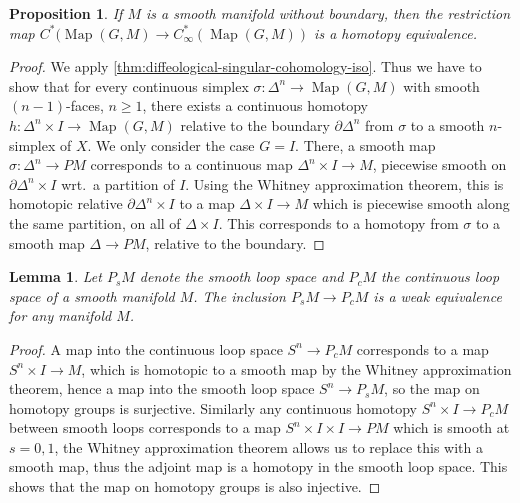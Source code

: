 \documentclass{scrartcl}
\theoremstyle{plain}
\newtheorem{proposition}[theorem]{Proposition}
\newtheorem{lemma}[theorem]{Lemma}
\theoremstyle{definition}
\DeclareMathOperator{\Map}{Map}
\begin{document}
\begin{proposition}\label{prop:comparison-singular-smooth-cohomology}
    If $M$ is a smooth manifold without boundary, then the restriction map $C^*(\Map(G, M) \to C_\infty^*(\Map(G, M))$ is a homotopy equivalence.
\end{proposition}
\begin{proof}
    We apply \cref{thm:diffeological-singular-cohomology-iso}. Thus we have to show that for every continuous simplex $\sigma\colon \Delta^n\to \Map(G, M)$ with smooth $(n-1)$-faces, $n\geq 1$, there exists a continuous homotopy $h\colon \Delta^n\times I\to \Map(G, M)$ relative to the boundary $\partial\Delta^n$ from $\sigma$ to a smooth $n$-simplex of $X$. We only consider the case $G=I$. There, a smooth map $\sigma\colon\Delta^n\to PM$ corresponds to a continuous map $\Delta^n\times I\to M$, piecewise smooth on $\partial\Delta^n\times I$ wrt.\ a partition of $I$. Using the Whitney approximation theorem, this is homotopic relative $\partial\Delta^n\times I$ to a map $\Delta\times I\to M$ which is piecewise smooth along the same partition, on all of $\Delta\times I$. This corresponds to a homotopy from $\sigma$ to a smooth map $\Delta\to PM$, relative to the boundary. 
\end{proof}

\begin{lemma}
Let $P_sM$ denote the smooth loop space and $P_cM$ the continuous loop space of a smooth manifold $M$. The inclusion $P_sM\to P_cM$ is a weak equivalence for any manifold $M$. 
\end{lemma}
\begin{proof}
    A map into the continuous loop space $S^n\to P_cM$ corresponds to a map $S^n\times I\to M$, which is homotopic to a smooth map by the Whitney approximation theorem, hence a map into the smooth loop space $S^n\to P_sM$, so the map on homotopy groups is surjective. Similarly any continuous homotopy $S^n\times I\to P_cM$ between smooth loops corresponds to a map $S^n\times I \times I\to PM$ which is smooth at $s=0, 1$, the Whitney approximation theorem allows us to replace this with a smooth map, thus the adjoint map is a homotopy in the smooth loop space. This shows that the map on homotopy groups is also injective. %
\end{proof}
\end{document}
